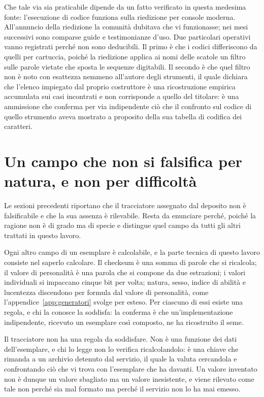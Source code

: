 Che tale via sia praticabile dipende da un fatto verificato in questa medesima fonte: l'esecuzione di codice funziona sulla riedizione per console moderna. All'annuncio della riedizione la comunità dubitava che vi funzionasse; nei mesi successivi sono comparse guide e testimonianze d'uso. Due particolari operativi vanno registrati perché non sono deducibili. Il primo è che i codici differiscono da quelli per cartuccia, poiché la riedizione applica ai nomi delle scatole un filtro sulle parole vietate che sposta le sequenze digitabili. Il secondo è che quel filtro non è noto con esattezza nemmeno all'autore degli strumenti, il quale dichiara che l'elenco impiegato dal proprio costruttore è una ricostruzione empirica accumulata sui casi incontrati e non corrisponde a quello del titolare: è una ammissione che conferma per via indipendente ciò che il confronto sul codice di quello strumento aveva mostrato a proposito della sua tabella di codifica dei caratteri.

\section{Un campo che non si falsifica per natura, e non per difficoltà}

Le sezioni precedenti riportano che il tracciatore assegnato dal deposito non è falsificabile e che la sua assenza è rilevabile. Resta da enunciare perché, poiché la ragione non è di grado ma di specie e distingue quel campo da tutti gli altri trattati in questo lavoro.

Ogni altro campo di un esemplare è calcolabile, e la parte tecnica di questo lavoro consiste nel saperlo calcolare. Il checksum è una somma di parole che si ricalcola; il valore di personalità è una parola che si compone da due estrazioni; i valori individuali si impaccano cinque bit per volta; natura, sesso, indice di abilità e lucentezza discendono per formula dal valore di personalità, come l'appendice~\ref{app:generatori} svolge per esteso. Per ciascuno di essi esiste una regola, e chi la conosce la soddisfa: la conferma è che un'implementazione indipendente, ricevuto un esemplare così composto, ne ha ricostruito il seme.

Il tracciatore non ha una regola da soddisfare. Non è una funzione dei dati dell'esemplare, e chi lo legge non lo verifica ricalcolandolo: è una chiave che rimanda a un archivio detenuto dal servizio, il quale la valuta cercandola e confrontando ciò che vi trova con l'esemplare che ha davanti. Un valore inventato non è dunque un valore sbagliato ma un valore inesistente, e viene rilevato come tale non perché sia mal formato ma perché il servizio non lo ha mai emesso.

